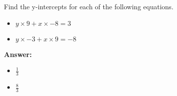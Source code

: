  Find the y-intercepts for each of the following equations. \begin{itemize}\item \( y \times 9 + x \times -8 = 3 \)\item \( y \times -3 + x \times 9 = -8 \)\end{itemize}

        \textbf{Answer:} \begin{itemize}\item \( \frac{1}{3} \)\item \( \frac{8}{3} \)\end{itemize}
